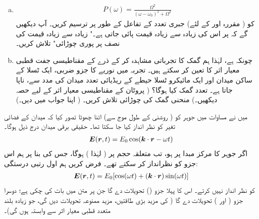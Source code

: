\begin{enumerate}[a.]
 
\item
{}
\begin{align}
	P(\omega) = \frac{\Omega^2}{(\omega-\omega_0)^2+\Omega^2}
\end{align}
کو ( مقررہ   اور  کے لئے)    جبری  تعدد  کے تفاعل کے طور پر ترسیم کریں۔ آپ دیکھیں گے کہ  پر اس کی زیادہ سے زیادہ قیمت پائی جاتی ہے۔" زیادہ سے زیادہ قیمت کی نصف پر پوری چوڑائی"   تلاش کریں۔
\item
 چونکہ  ہے،  لہٰذا ہم  گمک کا تجرباتی  مشاہدہ کر کے ذرے  کے  مقناطیسی جفت قطبی  معیار اثر کا  تعین کر سکتے ہیں۔   تجربہ میں نوریے  کا  جزو ضربی،  ایک ٹسلا  کے ساکن میدان اور ایک مائیکرو  ٹسلا   حیطے  کے ریڈیائی تعدد میدان کی مدد سے،  ناپا جاتا ہے۔ تعدد گمک کیا ہوگا؟ ( پروٹان کے  مقناطیسی معیار اثر کے لیے حصہ   دیکھیں۔) منحنی گمک کی چوڑائی تلاش کریں۔ ( اپنا جواب  میں دیں۔)
 \end{enumerate}
میں نے مساوات   میں  جوہر کو (  روشنی کے  طول موج  سے) اتنا چھوٹا تصور کیا  کہ میدان کے  فضائی تغیر کو نظر انداز کیا جا سکتا تھا۔ حقیقی برقی میدان درج ذیل ہوگا۔
\begin{align}
{\ensuremath{{\boldsymbol{E}}}}({{\boldsymbol{r}}},t) = E_0\cos({{\boldsymbol{k}}}\cdot {\ensuremath{{\boldsymbol{r}}}}-\omega t)
\end{align}
اگر جوہر کا مرکز مبدا پر ہو،  تب  متعلقہ حجم پر  
( لہٰذا  )   ہوگا،  جس کی بنا پر ہم اس جزو کو نظرانداز کر سکتے تھے۔ فرض کریں ہم  اول رتبی  درستگی:
\begin{align}
{\ensuremath{{\boldsymbol{E}}}}({{\boldsymbol{r}}},t) = E_0[\cos(\omega t)+({{\boldsymbol{k}}}\cdot{\ensuremath{{\boldsymbol{r}}}})\sin(\omega t)]
\end{align}
کو نظر انداز نہیں کرتے۔ اس کا  پہلا جزو   ()   تحویلات  دے گا  جن پر متن میں بات کی چکی ہے؛  دوسرا جزو  (    اور  ) تحویلات دے گا   (  کی  مزید  بڑی طاقتیں،  مزید  ممنوعہ تحویلات  دیں  گی،  جو زیادہ بلند متعدد قطبی معیار اثر سے  وابستہ ہوں گی)۔
